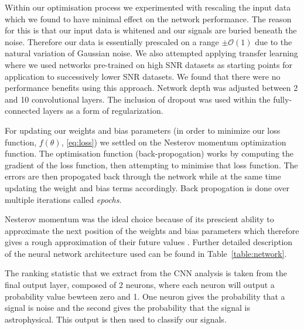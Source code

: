 \documentclass[%
showpacs,
 amsmath,amssymb,
 aps,
 twocolumn,
 prl,
 reprint,
floatfix,
]{revtex4-1}
\begin{document}
%
%
Within our optimisation process we experimented with rescaling the input data
which we found to have minimal effect on the network performance. The reason
for this is that our input data is whitened and our signals are buried beneath
the noise. Therefore our data is essentially prescaled on a range
$\pm\mathcal{O}(1)$ due to the natural variation of Gaussian noise. We also
attempted applying transfer learning \cite{5288526}
where we used networks pre-trained on high \ac{SNR} datasets as starting points
for application to successively lower \ac{SNR} datasets. We found that there
were no performance benefits using this approach.  Network depth was adjusted
between 2 and 10 convolutional layers. The
inclusion of dropout was used within the fully-connected layers as a form of
regularization.

%
%
For updating our weights and bias parameters (in
order to minimize our loss function, $f(\theta)$, \eqref{eq:loss}) we settled
on the Nesterov momentum optimization function. The optimisation function (back-propogation) works by
computing the gradient of the loss function, then attempting to minimise 
that loss function. The errors are then propogated back through the network while at the same time 
updating the weight and bias terms accordingly.  Back propogation is done over multiple iterations called \textit{epochs}. 



Nesterov momentum was the ideal choice because of its prescient ability to
approximate the next position of the weights and bias parameters which
therefore gives a rough approximation of their future values
\cite{Sutskever:2013:IIM:3042817.3043064}. Further detailed description of the
neural network architecture used can be found in
Table~\ref{table:network}. 

The ranking statistic that we extract from the CNN analysis is taken from the final output layer,
composed of 2 neurons, where each neuron will output a probability value bewteen zero and 1. One neuron gives the probability that a signal is noise and the second gives the probability that the signal is astrophysical. This output is then used to classify our signals.
\end{document}
